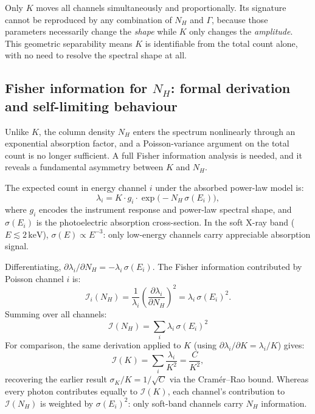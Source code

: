 \documentclass[11pt, a4paper]{article}
\begin{document}
Only $K$ moves all channels simultaneously and proportionally. Its signature cannot be
reproduced by any combination of $N_H$ and $\Gamma$, because those parameters
necessarily change the \emph{shape} while $K$ only changes the \emph{amplitude}. This
geometric separability means $K$ is identifiable from the total count alone, with no
need to resolve the spectral shape at all.

\subsection*{Fisher information for $N_H$: formal derivation and self-limiting behaviour}

Unlike $K$, the column density $N_H$ enters the spectrum nonlinearly through an
exponential absorption factor, and a Poisson-variance argument on the total count
is no longer sufficient. A full Fisher information analysis is needed, and it
reveals a fundamental asymmetry between $K$ and $N_H$.

The expected count in energy channel $i$ under the absorbed power-law model is:
\begin{equation}
    \lambda_i = K \cdot g_i \cdot \exp\!\bigl(-N_H\,\sigma(E_i)\bigr),
\end{equation}
where $g_i$ encodes the instrument response and power-law spectral shape, and
$\sigma(E_i)$ is the photoelectric absorption cross-section.
In the soft X-ray band ($E \lesssim 2\,\mathrm{keV}$), $\sigma(E) \propto E^{-3}$:
only low-energy channels carry appreciable absorption signal.

Differentiating, $\partial\lambda_i/\partial N_H = -\lambda_i\,\sigma(E_i)$.
The Fisher information contributed by Poisson channel $i$ is:
\begin{equation}
    \mathcal{I}_i(N_H)
    = \frac{1}{\lambda_i}\!\left(\frac{\partial\lambda_i}{\partial N_H}\right)^{\!2}
    = \lambda_i\,\sigma(E_i)^2.
\end{equation}
Summing over all channels:
\begin{equation}
    \boxed{
        \mathcal{I}(N_H) = \sum_i \lambda_i\,\sigma(E_i)^2
    }
    \label{eq:fisher_NH}
\end{equation}
For comparison, the same derivation applied to $K$ (using
$\partial\lambda_i/\partial K = \lambda_i/K$) gives:
\begin{equation}
    \mathcal{I}(K) = \sum_i \frac{\lambda_i}{K^2} = \frac{C}{K^2},
    \label{eq:fisher_K_formal}
\end{equation}
recovering the earlier result $\sigma_K/K = 1/\sqrt{C}$ via the Cram\'er--Rao bound.
Whereas every photon contributes equally to $\mathcal{I}(K)$, each channel's
contribution to $\mathcal{I}(N_H)$ is weighted by $\sigma(E_i)^2$: only soft-band
channels carry $N_H$ information.
\end{document}

